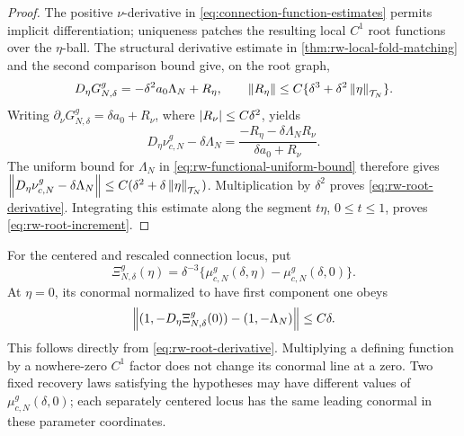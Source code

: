 \begin{proof}
The positive \(\nu\)-derivative in
\eqref{eq:connection-function-estimates} permits implicit differentiation;
uniqueness patches the resulting local \(C^1\) root functions over the
\(\eta\)-ball.  The structural derivative estimate in
\cref{thm:rw-local-fold-matching} and the second comparison bound give,
on the root graph,
\[
 D_\eta G_{N,\delta}^g
 =-\delta^2a_0\Lambda_N+R_\eta,
 \qquad
 \left\lVert R_\eta\right\rVert\le C\{\delta^3+\delta^2\left\lVert\eta\right\rVert_{\mathcal T_N}\}.
\]
Writing \(\partial_\nu G_{N,\delta}^g=\delta a_0+R_\nu\), where
\(\left\lvert R_\nu\right\rvert\le C\delta^2\), yields
\[
 D_\eta\nu_{c,N}^g-\delta\Lambda_N
 =\frac{-R_\eta-\delta\Lambda_NR_\nu}
             {\delta a_0+R_\nu}.
\]
The uniform bound for \(\Lambda_N\) in
\eqref{eq:rw-functional-uniform-bound} therefore gives
\(\left\lVert D_\eta\nu_{c,N}^g-\delta\Lambda_N\right\rVert
 \le C(\delta^2+\delta\left\lVert\eta\right\rVert_{\mathcal T_N})\).
Multiplication by \(\delta^2\) proves
\eqref{eq:rw-root-derivative}.  Integrating this estimate along the segment
\(t\eta\), \(0\le t\le1\), proves \eqref{eq:rw-root-increment}.
\end{proof}

\begin{remark}
For the centered and rescaled connection locus, put
\begin{equation}
 \Xi_{N,\delta}^g(\eta)
 =\delta^{-3}\{\mu_{c,N}^g(\delta,\eta)
                       -\mu_{c,N}^g(\delta,0)\}.
 \label{eq:rw-centered-root-graph}
\end{equation}
At \(\eta=0\), its conormal normalized to have first component one obeys
\begin{equation}
 \left\lVert(1,-D_\eta\Xi_{N,\delta}^g(0))-(1,-\Lambda_N)\right\rVert
       \le C\delta.
 \label{eq:rw-conormal-limit}
\end{equation}
This follows directly from \eqref{eq:rw-root-derivative}.  Multiplying a
defining function by a nowhere-zero \(C^1\) factor does not change its
conormal line at a zero.  Two fixed recovery laws satisfying the hypotheses
may have different values of \(\mu_{c,N}^g(\delta,0)\); each separately
centered locus has the same leading conormal in these parameter coordinates.
\end{remark}
